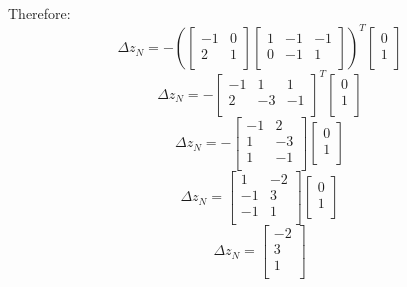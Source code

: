 \documentclass[14pt]{extarticle}
\begin{document}
\bigskip Therefore:
\[
    \Delta z_N = -\left(\begin{bmatrix}
        -1 & 0 \\
        2 & 1 \\
    \end{bmatrix}
    \begin{bmatrix}
        1 & -1 & -1 \\
        0 & -1 & 1 \\
    \end{bmatrix}\right)^T
    \begin{bmatrix}
        0 \\
        1 \\
    \end{bmatrix}
\]
\[
    \Delta z_N = -\begin{bmatrix}
        -1 & 1 & 1 \\
        2 & -3 & -1 \\
    \end{bmatrix}^T
    \begin{bmatrix}
        0 \\
        1 \\
    \end{bmatrix}
\]
\[
    \Delta z_N = -\begin{bmatrix}
        -1 & 2 \\
        1 & -3 \\
        1 & -1 \\
    \end{bmatrix}
    \begin{bmatrix}
        0 \\
        1 \\
    \end{bmatrix}
\]
\[
    \Delta z_N = \begin{bmatrix}
        1 & -2 \\
        -1 & 3 \\
        -1 & 1 \\
    \end{bmatrix}
    \begin{bmatrix}
        0 \\
        1 \\
    \end{bmatrix}
\]
\[
    \Delta z_N = \begin{bmatrix}
        -2 \\
        3 \\
        1 \\
    \end{bmatrix}
\]
\end{document}
